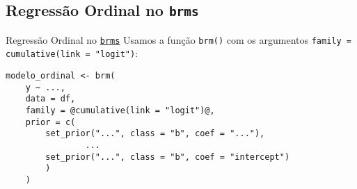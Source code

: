 \subsection{Regressão Ordinal no \texttt{brms}}
\begin{frame}[fragile]{Regressão Ordinal no \href{https://paul-buerkner.github.io/brms/}{\texttt{brms}}}
	Usamos a função \texttt{brm()} com os argumentos \texttt{family = cumulative(link = "logit")}:
	\vfill
	\begin{lstlisting}[basicstyle=\small]
    modelo_ordinal <- brm(
    y ~ ...,
    data = df,
    family = @cumulative(link = "logit")@,
    prior = c(
        set_prior("...", class = "b", coef = "..."),
                ...
        set_prior("...", class = "b", coef = "intercept")
        )
    )
    \end{lstlisting}
\end{frame}
